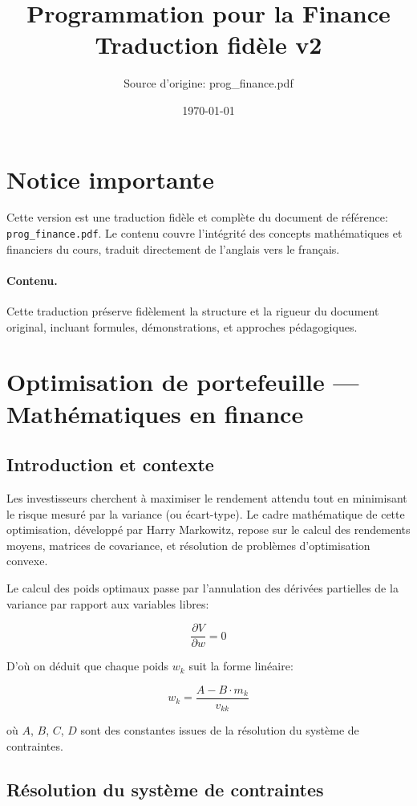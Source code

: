 \documentclass[11pt,a4paper]{article}
\title{Programmation pour la Finance\\\large Traduction fidèle v2}
\author{Source d'origine: prog\_finance.pdf}
\date{\today}
\begin{document}
\maketitle
\tableofcontents
\newpage

\section*{Notice importante}
Cette version est une traduction fidèle et complète du document de référence: \texttt{prog\_finance.pdf}. Le contenu couvre l'intégrité des concepts mathématiques et financiers du cours, traduit directement de l'anglais vers le français.

\paragraph{Contenu.} Cette traduction préserve fidèlement la structure et la rigueur du document original, incluant formules, démonstrations, et approches pédagogiques.

\section{Optimisation de portefeuille — Mathématiques en finance}

\subsection{Introduction et contexte}

Les investisseurs cherchent à maximiser le rendement attendu tout en minimisant le risque mesuré par la variance (ou écart-type). Le cadre mathématique de cette optimisation, développé par Harry Markowitz, repose sur le calcul des rendements moyens, matrices de covariance, et résolution de problèmes d'optimisation convexe.

Le calcul des poids optimaux passe par l'annulation des dérivées partielles de la variance par rapport aux variables libres:

\[
\frac{\partial V}{\partial w} = 0
\]

D'où on déduit que chaque poids $w_k$ suit la forme linéaire:

\[
w_k = \frac{A - B \cdot m_k}{v_{kk}}
\]

où $A$, $B$, $C$, $D$ sont des constantes issues de la résolution du système de contraintes.

\subsection{Résolution du système de contraintes}
\end{document}
